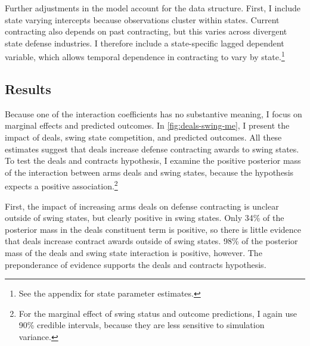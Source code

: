 \documentclass[12pt]{article}
\begin{document}
Further adjustments in the model account for the data structure.
First, I include state varying intercepts because observations cluster within states. 
Current contracting also depends on past contracting, but this varies across divergent state defense industries. 
I therefore include a state-specific lagged dependent variable, which allows temporal dependence in contracting to vary by state.\footnote{See the appendix for state parameter estimates.}






\subsection{Results}


Because one of the interaction coefficients has no substantive meaning, I focus on marginal effects and predicted outcomes.
In \autoref{fig:deals-swing-me}, I present the impact of deals, swing state competition, and predicted outcomes.
All these estimates suggest that deals increase defense contracting awards to swing states. 
To test the deals and contracts hypothesis, I examine the positive posterior mass of the interaction between arms deals and swing states, because the hypothesis expects a positive association.\footnote{For the marginal effect of swing status and outcome predictions, I again use 90\% credible intervals, because they are less sensitive to simulation variance.}


First, the impact of increasing arms deals on defense contracting is unclear outside of swing states, but clearly positive in swing states. 
Only 34\% of the posterior mass in the deals constituent term is positive, so there is little evidence that deals increase contract awards outside of swing states. 
98\% of the posterior mass of the deals and swing state interaction is positive, however. 
The preponderance of evidence supports the deals and contracts hypothesis.
\end{document}
